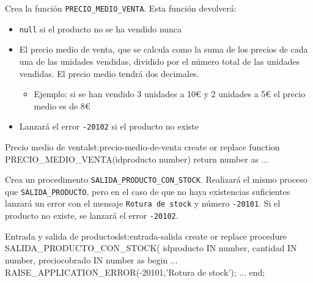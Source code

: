 \begin{homeworkProblem}

  Crea la función \texttt{PRECIO\_MEDIO\_VENTA}. Esta función devolverá:
  \begin{itemize}
  \item \texttt{null} si el producto no se ha vendido nunca
  \item El precio medio de venta, que se calcula como la suma de los precios de cada una de las unidades vendidas, dividido por el número total de las unidades vendidas. El precio medio tendrá dos decimales.
    \begin{itemize}
    \item Ejemplo: si se han vendido 3 unidades a 10{\euro} y 2 unidades a 5{\euro} el precio medio es de 8{\euro}
    \end{itemize}
  \item Lanzará el error \texttt{-20102} si el producto no existe
  \end{itemize}

  \begin{listadosql}{Precio medio de venta}{lst:precio-medio-de-venta}
create or replace function PRECIO_MEDIO_VENTA(idproducto number) return number
as
...
  \end{listadosql}  
  
\end{homeworkProblem}


\begin{homeworkProblem}

  Crea un procedimento \texttt{SALIDA\_PRODUCTO\_CON\_STOCK}. Realizará el mismo proceso que \texttt{SALIDA\_PRODUCTO}, pero en el caso de que no haya existencias suficientes lanzará un error con el mensaje \texttt{Rotura de stock} y número \texttt{-20101}. 
  Si el producto no existe, se lanzará el error \texttt{-20102}.

  \begin{listadosql}{Entrada y salida de productos}{lst:entrada-salida}
create or replace procedure SALIDA_PRODUCTO_CON_STOCK(
  idproducto IN number,
  cantidad IN number,
  preciocobrado IN number
as
begin
  ...
  RAISE_APPLICATION_ERROR(-20101,'Rotura de stock');
  ...
end; 
  \end{listadosql}
  
\end{homeworkProblem}

